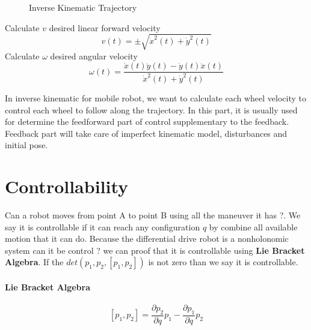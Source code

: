 \begin{figure}[ht]
	\centering
	
	\caption{Inverse Kinematic Trajectory}
\end{figure}

\begin{tcolorbox}[title=Reference Trajectory Velocity]
	Calculate $v$ desired linear forward velocity
	\begin{equation}
		v(t) = \pm \sqrt{\dot{x}^2(t) + \dot{y}^2(t)}
	\end{equation}
	Calculate $\omega$ desired angular velocity
	\begin{equation}
		\omega(t) = \frac{\dot{x}(t)\ddot{y}(t) - \dot{y}(t)\ddot{x}(t)}{\dot{x}^2(t) + \dot{y}^2(t)}
	\end{equation}
\end{tcolorbox}

In inverse kinematic for mobile robot, we want to calculate each wheel velocity to control each wheel to follow along the trajectory. In this part, it is usually used for determine the feedforward part of control supplementary to the feedback. Feedback part will take care of imperfect kinematic model, disturbances and initial pose.

\section{Controllability}
Can a robot moves from point A to point B using all the maneuver it has ?. We say it is controllable if it can reach any configuration $q$ by combine all available motion that it can do. Because the differential drive robot is a nonholonomic system can it be control ? we can proof that it is controllable using \textbf{Lie Bracket Algebra}. If the $det(p_1,p_2,[p_1,p_2])$ is not zero than we say it is controllable.
\paragraph{Lie Bracket Algebra}
\[
[p_1,p_2] = \frac{\partial p_2}{\partial q}p_1 -\frac{\partial p_1}{\partial q}p_2
\]
